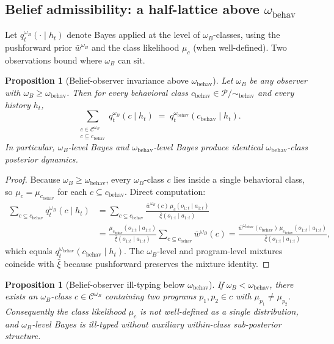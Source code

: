 \documentclass[11pt]{article}
\newtheorem{proposition}[theorem]{Proposition}
\theoremstyle{definition}
\theoremstyle{remark}
\newcommand{\Ccal}{\mathcal{C}}
\newcommand{\Pcal}{\mathcal{P}}
\newcommand{\barxi}{\bar{\xi}}
\begin{document}
\subsection{Belief admissibility: a half-lattice above $\omega_{\mathrm{behav}}$}
\label{sec:belief-admissibility}

Let $q_t^{\omega_B}(\cdot\mid h_t)$ denote Bayes applied at the level of $\omega_B$-classes, using the pushforward prior $\bar w^{\omega_B}$ and the class likelihood $\mu_c$ (when well-defined). Two observations bound where $\omega_B$ can sit.

\begin{proposition}[Belief-observer invariance above $\omega_{\mathrm{behav}}$]
\label{prop:belief-invariance-above}
Let $\omega_B$ be any observer with $\omega_B\ge\omega_{\mathrm{behav}}$. Then for every behavioral class $c_{\mathrm{behav}}\in\Pcal/\!\sim_{\mathrm{behav}}$ and every history $h_t$,
\[
\sum_{\substack{c\in\Ccal^{\omega_B}\\ c\subseteq c_{\mathrm{behav}}}}q_t^{\omega_B}(c\mid h_t)\;=\;q_t^{\omega_{\mathrm{behav}}}(c_{\mathrm{behav}}\mid h_t).
\]
In particular, $\omega_B$-level Bayes and $\omega_{\mathrm{behav}}$-level Bayes produce identical $\omega_{\mathrm{behav}}$-class posterior dynamics.
\end{proposition}

\begin{proof}
Because $\omega_B\ge\omega_{\mathrm{behav}}$, every $\omega_B$-class $c$ lies inside a single behavioral class, so $\mu_c=\mu_{c_{\mathrm{behav}}}$ for each $c\subseteq c_{\mathrm{behav}}$. Direct computation:
\begin{align*}
\sum_{c\subseteq c_{\mathrm{behav}}}q_t^{\omega_B}(c\mid h_t)
&=\sum_{c\subseteq c_{\mathrm{behav}}}\frac{\bar w^{\omega_B}(c)\,\mu_c(o_{1:t}\mid a_{1:t})}{\barxi(o_{1:t}\mid a_{1:t})}\\
&=\frac{\mu_{c_{\mathrm{behav}}}(o_{1:t}\mid a_{1:t})}{\barxi(o_{1:t}\mid a_{1:t})}\sum_{c\subseteq c_{\mathrm{behav}}}\bar w^{\omega_B}(c)
=\frac{\bar w^{\omega_{\mathrm{behav}}}(c_{\mathrm{behav}})\,\mu_{c_{\mathrm{behav}}}(o_{1:t}\mid a_{1:t})}{\barxi(o_{1:t}\mid a_{1:t})},
\end{align*}
which equals $q_t^{\omega_{\mathrm{behav}}}(c_{\mathrm{behav}}\mid h_t)$. The $\omega_B$-level and program-level mixtures coincide with $\barxi$ because pushforward preserves the mixture identity.
\end{proof}

\begin{proposition}[Belief-observer ill-typing below $\omega_{\mathrm{behav}}$]
\label{prop:belief-illtyped-below}
If $\omega_B<\omega_{\mathrm{behav}}$, there exists an $\omega_B$-class $c\in\Ccal^{\omega_B}$ containing two programs $p_1,p_2\in c$ with $\mu_{p_1}\neq\mu_{p_2}$. Consequently the class likelihood $\mu_c$ is not well-defined as a single distribution, and $\omega_B$-level Bayes is ill-typed without auxiliary within-class sub-posterior structure.
\end{proposition}
\end{document}
